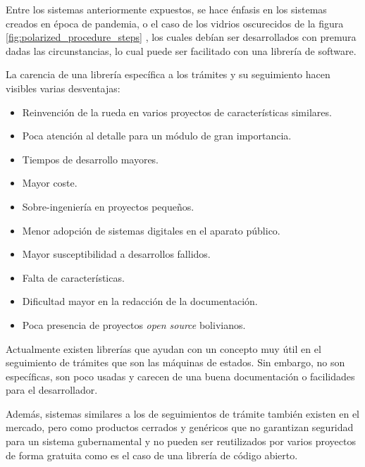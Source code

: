 Entre los sistemas anteriormente expuestos, se hace énfasis en los sistemas
creados en época de pandemia, o el caso de los vidrios oscurecidos de la figura
\ref{fig:polarized_procedure_steps} , los cuales debían ser desarrollados con
premura dadas las circunstancias, lo cual puede ser facilitado con una librería
de software.

La carencia de una librería específica a los trámites y su seguimiento hacen
visibles varias desventajas:

\begin{itemize}
	\item Reinvención de la rueda en varios proyectos de características
	      similares.

	\item Poca atención al detalle para un módulo de gran importancia.

	\item Tiempos de desarrollo mayores.

	\item Mayor coste.

	\item Sobre-ingeniería en proyectos pequeños.

	\item Menor adopción de sistemas digitales en el aparato público.

	\item Mayor susceptibilidad a desarrollos fallidos.

	\item Falta de características.

	\item Dificultad mayor en la redacción de la documentación.

\item Poca presencia de proyectos \textit{open source} bolivianos.
\end{itemize}

Actualmente existen librerías que ayudan con un concepto muy útil en el
seguimiento de trámites que son las máquinas de estados. Sin embargo, no son
específicas, son poco usadas y carecen de una buena documentación o facilidades
para el desarrollador.

Además, sistemas similares a los de seguimientos de trámite también existen en
el mercado, pero como productos cerrados y genéricos que no garantizan seguridad
para un sistema gubernamental y no pueden ser reutilizados por varios proyectos
de forma gratuita como es el caso de una librería de código abierto.


